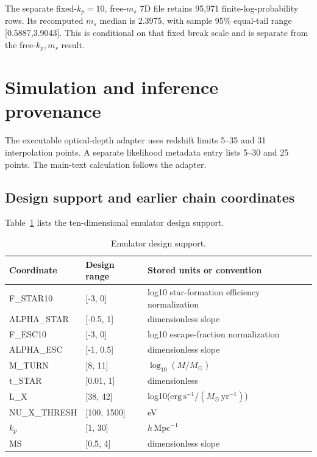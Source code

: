 The separate fixed-$k_p=10$, free-$m_s$ 7D file retains 95,971 finite-log-probability rows. Its recomputed $m_s$ median is 2.3975, with sample 95\% equal-tail range [0.5887,3.9043]. This is conditional on that fixed break scale and is separate from the free-$k_p,m_s$ result.

\section{Simulation and inference provenance}\label{app:provenance}

The executable optical-depth adapter uses redshift limits 5--35 and 31 interpolation points. A separate likelihood metadata entry lists 5--30 and 25 points. The main-text calculation follows the adapter.


\subsection{Design support and earlier chain coordinates}\label{parameter-domain-and-chain-definitions}

Table~\ref{tab:parameters} lists the ten-dimensional emulator design support.

\begin{table}[t]
\caption{Emulator design support.}
\label{tab:parameters}
\centering\small
\begin{tabular}{p{}p{}p{}}
\toprule
Coordinate & Design range & Stored units or convention \\
\midrule
F\_STAR10 & {[}-3, 0{]} & log10 star-formation efficiency normalization \\
ALPHA\_STAR & {[}-0.5, 1{]} & dimensionless slope \\
F\_ESC10 & {[}-3, 0{]} & log10 escape-fraction normalization \\
ALPHA\_ESC & {[}-1, 0.5{]} & dimensionless slope \\
M\_TURN & {[}8, 11{]} & $\log_{10}(M/M_\odot)$ \\
t\_STAR & {[}0.01, 1{]} & dimensionless \\
L\_X & {[}38, 42{]} & log10($\mathrm{erg\,s^{-1}}/(M_\odot\,\mathrm{yr^{-1}})$) \\
NU\_X\_THRESH & {[}100, 1500{]} & eV \\
\ensuremath{k_p} & {[}1, 30{]} & $h\,\mathrm{Mpc}^{-1}$ \\
MS & {[}0.5, 4{]} & dimensionless slope \\
\bottomrule
\end{tabular}
\end{table}

